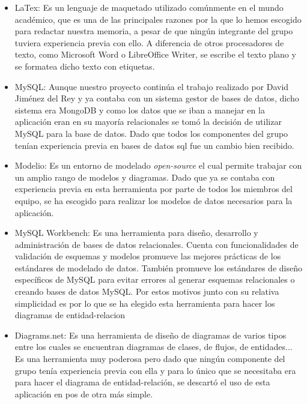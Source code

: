 \documentclass[11pt]{article}
\begin{document}
\begin{itemize}
	
	\item LaTex: Es un lenguaje de maquetado utilizado comúnmente en el mundo académico, que es una de las principales razones por la que lo hemos escogido para redactar nuestra memoria, a pesar de que ningún integrante del grupo tuviera experiencia previa con ello. A diferencia de otros procesadores de texto, como Microsoft Word o LibreOffice Writer, se escribe el texto plano y se formatea dicho texto con etiquetas. 
	
	\item MySQL: Aunque nuestro proyecto continúa el trabajo realizado por David Jiménez del Rey y ya contaba con un sistema gestor de bases de datos, dicho sistema era MongoDB y como los datos que se iban a manejar en la aplicación eran en su mayoría relacionales se tomó la decisión de utilizar MySQL para la base de datos. Dado que todos los componentes del grupo tenían experiencia previa en bases de datos sql fue un cambio bien recibido.
	
	\item Modelio: Es un entorno de modelado \emph{open-source} el cual permite trabajar con un amplio rango de modelos y diagramas. Dado que ya se contaba con experiencia previa en esta herramienta por parte de todos los miembros del equipo, se ha escogido para realizar los modelos de datos necesarios para la aplicación.
	
	\item MySQL Workbench: Es una herramienta para diseño, desarrollo y administración de bases de datos relacionales. 
	Cuenta con funcionalidades de validación de esquemas y modelos promueve las mejores prácticas de los estándares de modelado de datos. También promueve los estándares de diseño específicos de MySQL para evitar errores al generar esquemas relacionales o creando bases de datos MySQL. Por estos motivos junto con su relativa simplicidad es por lo que se ha elegido esta herramienta para hacer los diagramas de entidad-relacion
	
	\item Diagrams.net: Es una herramienta de diseño de diagramas de varios tipos entre los cuales se encuentran diagramas de clases, de flujos, de entidades...
	Es una herramienta muy poderosa pero dado que ningún componente del grupo tenía experiencia previa con ella y para lo único que se necesitaba era para hacer el diagrama de entidad-relación, se descartó el uso de esta aplicación en pos de otra más simple.
\end{itemize}
\end{document}
